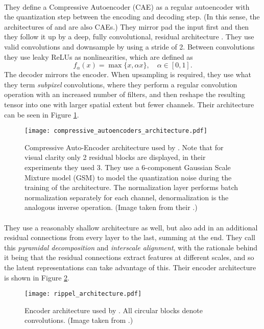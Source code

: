 \paragraph{\cite{theis2017lossy}} They define a Compressive Autoencoder (CAE) as a regular
autoencoder with the quantization step between the encoding and decoding step.
(In this sense, the architectures of \cite{balle2016end} and
\cite{balle2018variational} are also CAEs.) They mirror pad the input first
and then they follow it up by a deep, fully convolutional, residual
architecture \cite{he2016deep}. They use valid convolutions and downsample by
using a stride of 2. Between convolutions they use leaky ReLUs as
nonlinearities, which are defined as 
\[
  f_\alpha(x) = \max\{x, \alpha x\}, \quad \alpha \in [0, 1].
\]
The decoder mirrors the encoder. When upsampling is required, they use what
they term \textit{subpixel} convolutions, where they perform a regular
convolution operation with an increased number of filters, and then reshape
the resulting tensor into one with larger spatial extent but fewer channels.
Their architecture can be seen in Figure \ref{fig:comp_auto_arch}.
\begin{figure}
  \centering 
  \texttt{[image: compressive\_autoencoders\_architecture.pdf]}
  \caption[Compressive Auto-Encoder architecture used by \cite{theis2017lossy}.]
  {Compressive Auto-Encoder architecture used by \cite{theis2017lossy}.
    Note that for visual clarity only 2 residual blocks are displayed,
    in their experiments they used 3. They use a 6-component Gaussian Scale
    Mixture model (GSM) to model the quantization noise during the training of
    the architecture. The normalization layer performs batch normalization
    separately for each channel, denormalization is the analogous inverse
    operation. (Image taken from their \cite{theis2017lossy}.)}
  \label{fig:comp_auto_arch}
\end{figure}

\paragraph{\cite{rippel2017real}} They use a reasonably shallow architecture as well,
but also add in an additional residual connections from every layer to the last,
summing at the end. They call this
\textit{pyramidal decomposition} and \textit{interscale alignment}, with the
rationale behind it being that the residual connections extract features at
different scales, and so the latent representations can take advantage of this.
Their encoder architecture is shown in Figure \ref{fig:rippel_arch}.
\begin{figure}
  \centering 
  \texttt{[image: rippel\_architecture.pdf]}
  \caption[Encoder architecture used by \cite{rippel2017real}.]
  {Encoder architecture used by \cite{rippel2017real}. All circular blocks
    denote convolutions. (Image taken from \cite{rippel2017real}.)}
  \label{fig:rippel_arch}
\end{figure}
